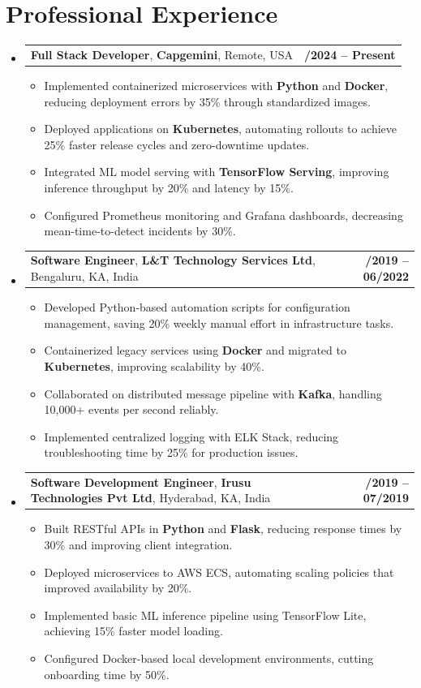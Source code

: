 \documentclass[letterpaper,11pt]{article}
\makeatletter
\newcommand{\resumeItem}[1]{
  \item\footnotesize{
    {#1 \vspace{-2pt}}
  }
}
\newcommand{\resumeSubheading}[4]{
  \vspace{-2pt}\item
    \begin{tabular*}{1.0\textwidth}[t]{l@{\extracolsep{\fill}}r}
      \textbf{\fontsize{10pt}{14pt}\selectfont #3}, \textbf{\fontsize{10pt}{14pt}\selectfont #1}, \fontsize{10pt}{14pt}\selectfont #4 & \textbf{\fontsize{10pt}{14pt}\selectfont #2} \\
    \end{tabular*}\vspace{-7pt}
}
\newcommand{\resumeSubHeadingListStart}{\begin{itemize}[leftmargin=0pt, label={}]}
\newcommand{\resumeSubHeadingListEnd}{\end{itemize}}
\newcommand{\resumeItemListStart}{\begin{itemize}[leftmargin=*]}
\newcommand{\resumeItemListEnd}{\end{itemize}\vspace{-5pt}}
\makeatother
\begin{document}
\section{Professional Experience}
  \resumeSubHeadingListStart

    \resumeSubheading
        {Capgemini}{01/2024 -- Present}
        {Full Stack Developer}{Remote, USA}
      \resumeItemListStart
        \resumeItem{Implemented containerized microservices with \textbf{Python} and \textbf{Docker}, reducing deployment errors by 35\% through standardized images.}
        \resumeItem{Deployed applications on \textbf{Kubernetes}, automating rollouts to achieve 25\% faster release cycles and zero-downtime updates.}
        \resumeItem{Integrated ML model serving with \textbf{TensorFlow Serving}, improving inference throughput by 20\% and latency by 15\%.}
        \resumeItem{Configured Prometheus monitoring and Grafana dashboards, decreasing mean-time-to-detect incidents by 30\%.}
      \resumeItemListEnd

    \resumeSubheading
        {L\&T Technology Services Ltd}{08/2019 -- 06/2022}
        {Software Engineer}{Bengaluru, KA, India}
      \resumeItemListStart
        \resumeItem{Developed Python-based automation scripts for configuration management, saving 20\% weekly manual effort in infrastructure tasks.}
        \resumeItem{Containerized legacy services using \textbf{Docker} and migrated to \textbf{Kubernetes}, improving scalability by 40\%.}
        \resumeItem{Collaborated on distributed message pipeline with \textbf{Kafka}, handling 10,000+ events per second reliably.}
        \resumeItem{Implemented centralized logging with ELK Stack, reducing troubleshooting time by 25\% for production issues.}
      \resumeItemListEnd

    \resumeSubheading
        {Irusu Technologies Pvt Ltd}{01/2019 -- 07/2019}
        {Software Development Engineer}{Hyderabad, KA, India}
      \resumeItemListStart
        \resumeItem{Built RESTful APIs in \textbf{Python} and \textbf{Flask}, reducing response times by 30\% and improving client integration.}
        \resumeItem{Deployed microservices to AWS ECS, automating scaling policies that improved availability by 20\%.}
        \resumeItem{Implemented basic ML inference pipeline using TensorFlow Lite, achieving 15\% faster model loading.}
        \resumeItem{Configured Docker-based local development environments, cutting onboarding time by 50\%.}
      \resumeItemListEnd

  \resumeSubHeadingListEnd
\end{document}
